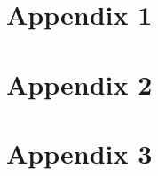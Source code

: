 \section{Appendix 1}
    
        
        
        

\section{Appendix 2}


\section{Appendix 3}
        
